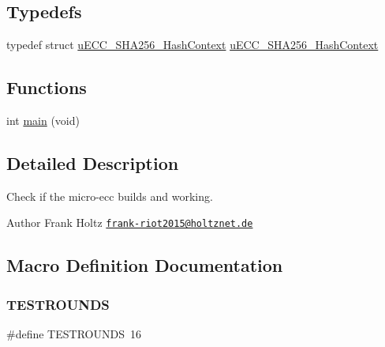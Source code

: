 \subsection*{Typedefs}
\begin{DoxyCompactItemize}
\item 
typedef struct \hyperlink{structuECC__SHA256__HashContext}{u\+E\+C\+C\+\_\+\+S\+H\+A256\+\_\+\+Hash\+Context} \hyperlink{pkg__micro-ecc_2main_8c_acb2891c94fdd261dccb2479045829596}{u\+E\+C\+C\+\_\+\+S\+H\+A256\+\_\+\+Hash\+Context}
\end{DoxyCompactItemize}
\subsection*{Functions}
\begin{DoxyCompactItemize}
\item 
int \hyperlink{pkg__micro-ecc_2main_8c_a840291bc02cba5474a4cb46a9b9566fe}{main} (void)
\end{DoxyCompactItemize}


\subsection{Detailed Description}
Check if the micro-\/ecc builds and working. 

\begin{DoxyAuthor}{Author}
Frank Holtz \href{mailto:frank-riot2015@holtznet.de}{\tt frank-\/riot2015@holtznet.\+de} 
\end{DoxyAuthor}


\subsection{Macro Definition Documentation}
\mbox{\label{pkg__micro-ecc_2main_8c_af923d96bdee3816363ed1cc4b7c82ad2}} 
\subsubsection{\texorpdfstring{T\+E\+S\+T\+R\+O\+U\+N\+DS}{TESTROUNDS}}
{\footnotesize\ttfamily \#define T\+E\+S\+T\+R\+O\+U\+N\+DS~16}



